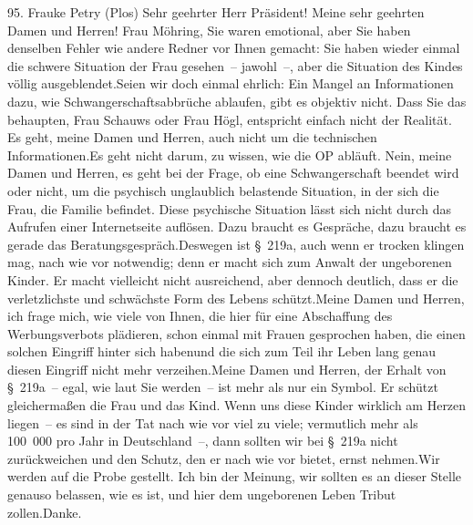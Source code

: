 \documentclass{article}
\begin{document}
	95. Frauke Petry (Plos) Sehr geehrter Herr Präsident! Meine sehr geehrten Damen und Herren! Frau Möhring, Sie waren emotional, aber Sie haben denselben Fehler wie andere Redner vor Ihnen gemacht: Sie haben wieder einmal die schwere Situation der Frau gesehen – jawohl –, aber die Situation des Kindes völlig ausgeblendet.Seien wir doch einmal ehrlich: Ein Mangel an Informationen dazu, wie Schwangerschaftsabbrüche ablaufen, gibt es objektiv nicht. Dass Sie das behaupten, Frau Schauws oder Frau Högl, entspricht einfach nicht der Realität. Es geht, meine Damen und Herren, auch nicht um die technischen Informationen.Es geht nicht darum, zu wissen, wie die OP abläuft. Nein, meine Damen und Herren, es geht bei der Frage, ob eine Schwangerschaft beendet wird oder nicht, um die psychisch unglaublich belastende Situation, in der sich die Frau, die Familie befindet. Diese psychische Situation lässt sich nicht durch das Aufrufen einer Internetseite auflösen. Dazu braucht es Gespräche, dazu braucht es gerade das Beratungsgespräch.Deswegen ist § 219a, auch wenn er trocken klingen mag, nach wie vor notwendig; denn er macht sich zum Anwalt der ungeborenen Kinder. Er macht vielleicht nicht ausreichend, aber dennoch deutlich, dass er die verletzlichste und schwächste Form des Lebens schützt.Meine Damen und Herren, ich frage mich, wie viele von Ihnen, die hier für eine Abschaffung des Werbungsverbots plädieren, schon einmal mit Frauen gesprochen haben, die einen solchen Eingriff hinter sich habenund die sich zum Teil ihr Leben lang genau diesen Eingriff nicht mehr verzeihen.Meine Damen und Herren, der Erhalt von § 219a – egal, wie laut Sie werden – ist mehr als nur ein Symbol. Er schützt gleichermaßen die Frau und das Kind. Wenn uns diese Kinder wirklich am Herzen liegen – es sind in der Tat nach wie vor viel zu viele; vermutlich mehr als 100 000 pro Jahr in Deutschland –, dann sollten wir bei § 219a nicht zurückweichen und den Schutz, den er nach wie vor bietet, ernst nehmen.Wir werden auf die Probe gestellt. Ich bin der Meinung, wir sollten es an dieser Stelle genauso belassen, wie es ist, und hier dem ungeborenen Leben Tribut zollen.Danke.
\end{document}
